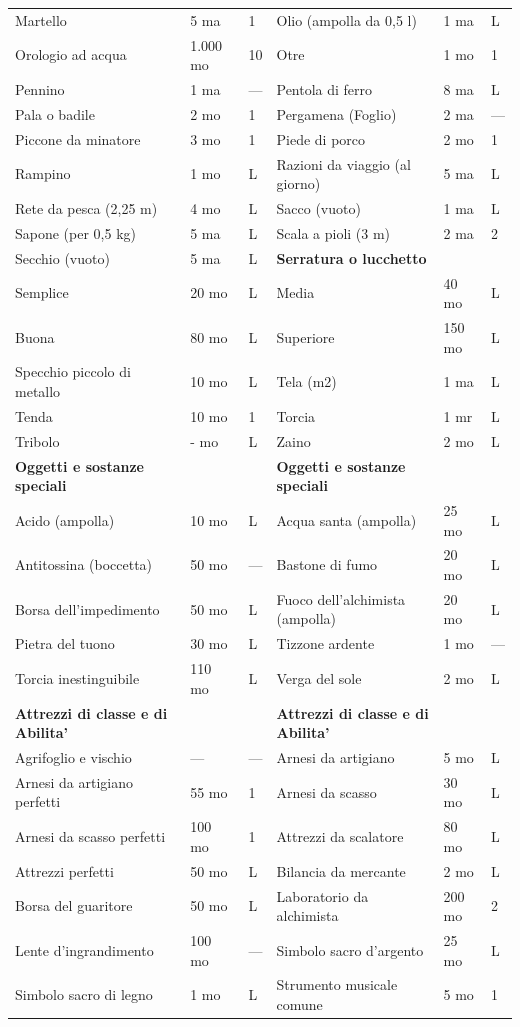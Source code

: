 \documentclass[a4paper,11pt,twoside,openany]{book}
\begin{document}
{\begin{longtable}{|L{4cm} |k{1.5cm} |k{1.5cm}|L{5cm} |k{1.5cm} |k{1.5cm}|}
Martello&5 ma&1&	Olio (ampolla da 0,5 l)&1 ma&L\\
Orologio ad acqua&1.000 mo&10&	Otre&1 mo&1\\
Pennino&1 ma&—&	Pentola di ferro&8 ma&L\\
Pala o badile&2 mo&1&	Pergamena (Foglio)&2 ma&—\\
Piccone da minatore&3 mo&1&	Piede di porco&2 mo&1\\
Rampino&1 mo&L&	Razioni da viaggio (al giorno)&5 ma&L\\
Rete da pesca (2,25 m)&4 mo&L&	Sacco (vuoto)&1 ma&L\\
Sapone (per 0,5 kg)&5 ma&L&	Scala a pioli (3 m)&2 ma&2\\
Secchio (vuoto)&5 ma&L&	\textbf{Serratura o lucchetto}&&\\
Semplice&20 mo&L&	Media&40 mo&L\\
Buona&80 mo&L&	Superiore&150 mo&L\\
Specchio piccolo di metallo&10 mo&L&	Tela (m2)&1 ma&L\\
Tenda&10 mo&1&	Torcia&1 mr&L\\
Tribolo&- mo&L&	Zaino&2 mo&L\\
\textbf{Oggetti e sostanze speciali}&&&	\textbf{Oggetti e sostanze speciali}&&\\
Acido (ampolla)&10 mo&L&	Acqua santa (ampolla)&25 mo&L\\
Antitossina (boccetta)&50 mo&—&	Bastone di fumo&20 mo&L\\
Borsa dell’impedimento&50 mo&L&	Fuoco dell’alchimista (ampolla)&20 mo&L\\
Pietra del tuono&30 mo&L&	Tizzone ardente&1 mo&—\\
Torcia inestinguibile&110 mo&L&	Verga del sole&2 mo&L\\
\textbf{Attrezzi di classe e di Abilita'}&&&\textbf{Attrezzi di classe e di Abilita'}&&\\
Agrifoglio e vischio&—&—&	Arnesi da artigiano&5 mo&L\\
Arnesi da artigiano perfetti&55 mo&1&	Arnesi da scasso&30 mo&L\\
Arnesi da scasso perfetti&100 mo&1&	Attrezzi da scalatore&80 mo&L\\
Attrezzi perfetti&50 mo&L&	Bilancia da mercante&2 mo&L\\
Borsa del guaritore&50 mo&L&	Laboratorio da alchimista&200 mo&2\\
Lente d’ingrandimento&100 mo&—&	Simbolo sacro d’argento&25 mo&L\\
Simbolo sacro di legno&1 mo&L&	Strumento musicale comune&5 mo&1\\

\end{longtable}}
\end{document}
